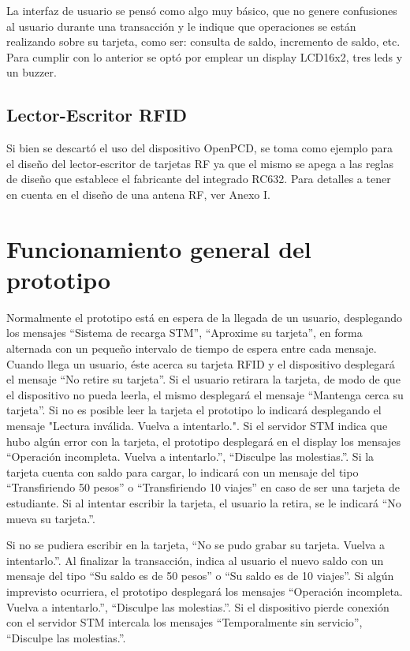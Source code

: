 La interfaz de usuario se pensó como algo muy básico, que no genere confusiones al usuario durante una transacción y le indique que operaciones se están realizando sobre su tarjeta, como ser: consulta de saldo, incremento de saldo, etc. Para cumplir con lo anterior se optó por emplear un display LCD16x2, tres leds y un buzzer.

\subsection{Lector-Escritor RFID}
Si bien se descartó el uso del dispositivo OpenPCD, se toma como ejemplo para el diseño del lector-escritor de tarjetas RF ya que el mismo se apega a las reglas de diseño que establece el fabricante del integrado RC632.
Para detalles a tener en cuenta en el diseño de una antena RF, ver Anexo I.

\section{Funcionamiento general del prototipo}
Normalmente el prototipo está en espera de la llegada de un usuario, desplegando los
mensajes “Sistema de recarga STM”, “Aproxime su tarjeta”, en forma alternada con un
pequeño intervalo de tiempo de espera entre cada mensaje.
Cuando llega un usuario, éste acerca su tarjeta RFID y el dispositivo desplegará el mensaje
“No retire su tarjeta”. Si el usuario retirara la tarjeta, de modo de que el dispositivo no pueda
leerla, el mismo desplegará el mensaje “Mantenga cerca su tarjeta”. Si no es posible leer la
tarjeta el prototipo lo indicará desplegando el mensaje "Lectura inválida. Vuelva a
intentarlo.".
Si el servidor STM indica que hubo algún error con la tarjeta, el prototipo desplegará en el
display los mensajes “Operación incompleta. Vuelva a intentarlo.”, “Disculpe las
molestias.”.
Si la tarjeta cuenta con saldo para cargar, lo indicará con un mensaje del tipo “Transfiriendo
50 pesos” o “Transfiriendo 10 viajes” en caso de ser una tarjeta de estudiante.
Si al intentar escribir la tarjeta, el usuario la retira, se le indicará “No mueva su tarjeta.”.

Si no se pudiera escribir en la tarjeta, “No se pudo grabar su tarjeta. Vuelva a intentarlo.”.
Al finalizar la transacción, indica al usuario el nuevo saldo con un mensaje del tipo “Su
saldo es de 50 pesos” o “Su saldo es de 10 viajes”.
Si algún imprevisto ocurriera, el prototipo desplegará los mensajes “Operación incompleta.
Vuelva a intentarlo.”, “Disculpe las molestias.”.
Si el dispositivo pierde conexión con el servidor STM intercala los mensajes
“Temporalmente sin servicio”, “Disculpe las molestias.”.


